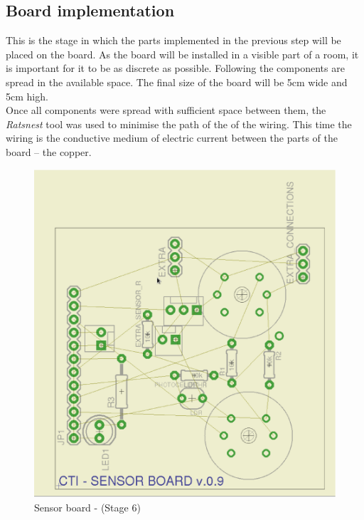 \documentclass[12pt,a4paper]{report}
\begin{document}
\subsection{Board implementation}
This is the stage in which the parts implemented in the previous step will be placed on the board.
As the board will be installed in a visible part of a room, it is important for it to be as discrete as possible.
Following the components are spread in the available space.
The final size of the board will be 5cm wide and 5cm high.
\ \\
Once all components were spread with sufficient space between them, the \textit{Ratsnest} tool was used to minimise the path of the of the wiring.
This time the wiring is the conductive medium of electric current between the parts of the board -- the copper.
\ \\
\begin{figure}[H]
\centering
\includegraphics*[scale=0.25]{sens_brd_s7}
\caption{Sensor board -  (Stage 6)}
\label{Sensor-brd-s7}
\end{figure}
\end{document}

